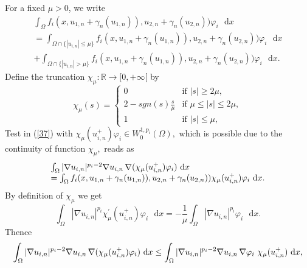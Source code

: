 \documentclass[11pt]{amsart}
\theoremstyle{definition}
\theoremstyle{remark}
\numberwithin{equation}{section}
\begin{document}
For a fixed $\mu >0$, we write 
\begin{equation}
\begin{array}{l}
\int_{\Omega }f_{i}(x,u_{1,n}+\gamma _{n}(u_{1,n})),u_{2,n}+\gamma
_{n}(u_{2,n}))\varphi _{i}\text{ }\mathrm{d}x \\ 
=\int_{\Omega \cap \{|u_{i,n}|\leq \mu \}}f_{i}(x,u_{1,n}+\gamma
_{n}(u_{1,n})),u_{2,n}+\gamma _{n}(u_{2,n}))\varphi _{i}\text{ }\mathrm{d}x
\\ 
+\int_{\Omega \cap \{|u_{i,n}|>\mu \}}f_{i}(x,u_{1,n}+\gamma
_{n}(u_{1,n})),u_{2,n}+\gamma _{n}(u_{2,n}))\varphi _{i}\text{ }\mathrm{d}x.%
\end{array}
\label{44}
\end{equation}%
Define the truncation $\chi _{\mu }:%
\mathbb{R}
\rightarrow \lbrack 0,+\infty \lbrack $ by 
\begin{equation*}
\chi _{\mu }(s)=\left\{ 
\begin{array}{ll}
0 & \text{if }|s|\geq 2\mu , \\ 
2-sgn(s)\frac{s}{\mu } & \text{if }\mu \leq |s|\leq 2\mu , \\ 
1 & \text{if }|s|\leq \mu ,%
\end{array}
\right.
\end{equation*}%
Test in (\ref{37}) with $\chi _{\mu }(u_{i,n}^{+})\varphi _{i}\in
W_{0}^{1,p_{i}}(\Omega ),$ which is possible due to the continuity of
function $\chi _{\mu },$ reads as%
\begin{equation}
\begin{array}{l}
\int_{\Omega }|\nabla u_{i,n}|^{p_{i}-2}\nabla u_{i,n}\text{\thinspace }
\nabla (\chi _{\mu }(u_{i,n}^{+})\varphi _{i})\text{ }\mathrm{d}x \\ 
=\int_{\Omega }f_{i}(x,u_{1,n}+\gamma _{n}(u_{1,n})),u_{2,n}+\gamma
_{n}(u_{2,n}))\chi _{\mu }(u_{i,n}^{+})\varphi _{i}\text{ }\mathrm{d}x.%
\end{array}
\label{45}
\end{equation}%
By definition of $\chi _{\mu }$ we get 
\begin{equation}
\int_{\Omega }|\nabla u_{i,n}|^{p_{i}}\chi _{\mu }^{\prime
}(u_{i,n}^{+})\varphi _{i}\text{ }\mathrm{d}x=-\frac{1}{\mu }\int_{\Omega
}|\nabla u_{i,n}|^{p_{i}}\varphi _{i}\text{ }\mathrm{d}x.  \label{46}
\end{equation}%
Thence%
\begin{equation}
\int_{\Omega }|\nabla u_{i,n}|^{p_{i}-2}\nabla u_{i,n}\text{\thinspace }
\nabla (\chi _{\mu }(u_{i,n}^{+})\varphi _{i})\text{ }\mathrm{d}x\leq
\int_{\Omega }|\nabla u_{i,n}|^{p_{i}-2}\nabla u_{i,n}\text{\thinspace }
\nabla \varphi _{i}\text{ }\chi _{\mu }(u_{i,n}^{+})\text{ }\mathrm{d}x,
\label{47}
\end{equation}%
\end{document}
